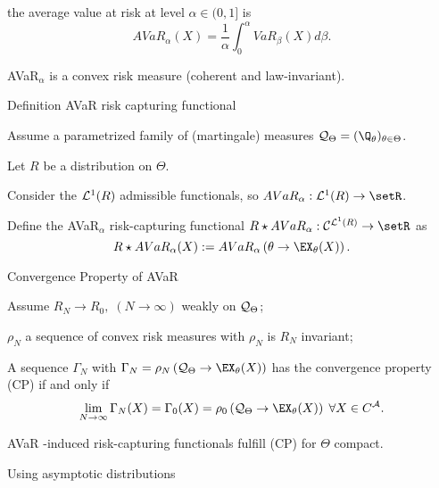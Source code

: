 	the average value at risk at level $\alpha \in (0,1]$ is
$$
AVaR_\alpha(X) = \frac{1}{\alpha} \int_0^\alpha VaR_\beta(X) d\beta.
$$

	AVaR$_\alpha$ is a convex risk measure (coherent and law-invariant).






{Definition AVaR risk capturing functional}






	Assume a  parametrized family of (martingale) measures ${\cal Q}_\Theta = (\Q_\theta)_{\theta \in \Theta}$.

	Let $R$ be a distribution on $\Theta$.

	Consider the ${\cal L}^1(R)$ admissible functionals, so $AVaR_\alpha:  {\cal L}^1(R) \rightarrow \setR$.

	Define the AVaR$_\alpha$ risk-capturing functional
$
R \star AVaR_\alpha: {\cal C}^{{\cal L}^1(R)}\rightarrow \setR
$
as
$$
R \star AVaR_\alpha(X) := AVaR_\alpha\left(\theta \rightarrow \EX_\theta(X) \right).
$$






{Convergence Property of AVaR}






	Assume $R_N \rightarrow R_0, \; (N\rightarrow \infty) $ weakly on ${\cal Q}_\Theta$;

	$\rho_N$ a sequence of convex risk measures with $\rho_N$ is $R_N$ invariant;

	A sequence $\Gamma_N$ with $\Gamma_N= \rho_N\left({\cal Q}_\Theta \rightarrow \EX_\theta(X) \right)$ has the convergence property (CP) if and only if
$$
\lim_{N \rightarrow \infty} \Gamma_N(X) = \Gamma_0(X) = \rho_0 \left({\cal Q}_\Theta \rightarrow \EX_\theta(X) \right) \; \forall X \in C^{\cal A}.
$$

	AVaR -induced risk-capturing functionals fulfill (CP) for $\Theta$ compact.






{Using asymptotic distributions}



